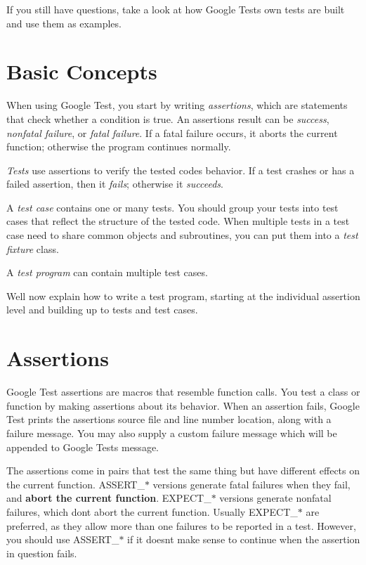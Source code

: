 If you still have questions, take a look at how Google Test\textquotesingle{}s own tests are built and use them as examples.

\section*{Basic Concepts}

When using Google Test, you start by writing {\itshape assertions}, which are statements that check whether a condition is true. An assertion\textquotesingle{}s result can be {\itshape success}, {\itshape nonfatal failure}, or {\itshape fatal failure}. If a fatal failure occurs, it aborts the current function; otherwise the program continues normally.

{\itshape Tests} use assertions to verify the tested code\textquotesingle{}s behavior. If a test crashes or has a failed assertion, then it {\itshape fails}; otherwise it {\itshape succeeds}.

A {\itshape test case} contains one or many tests. You should group your tests into test cases that reflect the structure of the tested code. When multiple tests in a test case need to share common objects and subroutines, you can put them into a {\itshape test fixture} class.

A {\itshape test program} can contain multiple test cases.

We\textquotesingle{}ll now explain how to write a test program, starting at the individual assertion level and building up to tests and test cases.

\section*{Assertions}

Google Test assertions are macros that resemble function calls. You test a class or function by making assertions about its behavior. When an assertion fails, Google Test prints the assertion\textquotesingle{}s source file and line number location, along with a failure message. You may also supply a custom failure message which will be appended to Google Test\textquotesingle{}s message.

The assertions come in pairs that test the same thing but have different effects on the current function. {\ttfamily A\+S\+S\+E\+R\+T\+\_\+$\ast$} versions generate fatal failures when they fail, and {\bfseries abort the current function}. {\ttfamily E\+X\+P\+E\+C\+T\+\_\+$\ast$} versions generate nonfatal failures, which don\textquotesingle{}t abort the current function. Usually {\ttfamily E\+X\+P\+E\+C\+T\+\_\+$\ast$} are preferred, as they allow more than one failures to be reported in a test. However, you should use {\ttfamily A\+S\+S\+E\+R\+T\+\_\+$\ast$} if it doesn\textquotesingle{}t make sense to continue when the assertion in question fails.

